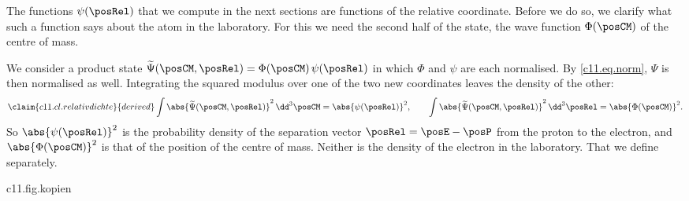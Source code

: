 The functions $\psi(\posRel)$ that we compute in the next sections are functions of the
relative coordinate. Before we do so, we clarify what such a function says about the atom
in the laboratory. For this we need the second half of the state, the wave function
$\Phi(\posCM)$ of the centre of mass.

We consider a product state
$\widetilde{\Psi}(\posCM, \posRel) = \Phi(\posCM)\,\psi(\posRel)$ in which $\Phi$ and
$\psi$ are each normalised. By \eqref{c11.eq.norm}, $\Psi$ is then normalised as well.
Integrating the squared modulus over one of the two new coordinates leaves the density of
the other:
\begin{equation}\label{c11.eq.relativdichte}\claim{c11.cl.relativdichte}{derived}
  \int \abs{\widetilde{\Psi}(\posCM, \posRel)}^2 \,\dd^3\posCM = \abs{\psi(\posRel)}^2,
  \qquad
  \int \abs{\widetilde{\Psi}(\posCM, \posRel)}^2 \,\dd^3\posRel = \abs{\Phi(\posCM)}^2.
\end{equation}
So $\abs{\psi(\posRel)}^2$ is the probability density of the separation vector
$\posRel = \posE - \posP$ from the proton to the electron, and $\abs{\Phi(\posCM)}^2$ is
that of the position of the centre of mass. Neither is the density of the electron in the
laboratory. That we define separately.


\begin{tpcfigure}{c11.fig.kopien}
  \caption{How the density of the electron in the laboratory comes about, as a diagram; lengths and line weights mean nothing. Every possible position of the centre of mass (crosses) carries a scaled copy of the relative density (rings), with $g_b(\boldsymbol{y}) = b^{-3}g(\boldsymbol{y}/b)$, $g = \abs{\psi}^2$ and $b = \massP/\massTot$, weighted by the probability of this position in the centre-of-mass state. The sum of all copies is $\densE$. The calculation follows.}
\end{tpcfigure}

